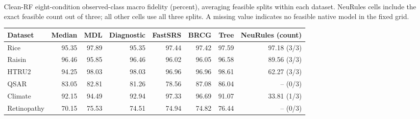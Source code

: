 \begin{kbtable}
\centering
\caption{Clean-RF eight-condition observed-class macro fidelity (percent), averaging feasible splits within each dataset. NeuRules cells include the exact feasible count out of three; all other cells use all three splits. A missing value indicates no feasible native model in the fixed grid.}
\label{tab:independent-per-data}
\small
\begin{adjustbox}{max width=\linewidth}
\begin{tabular}{lrrrrrrr}
\toprule
Dataset & Median & MDL & Diagnostic & FastSRS & BRCG & Tree & NeuRules (count) \\
\midrule
Rice & 95.35 & 97.89 & 95.35 & 97.44 & 97.42 & 97.59 & 97.18 (3/3) \\
Raisin & 96.46 & 95.85 & 96.46 & 96.02 & 96.05 & 96.58 & 89.56 (3/3) \\
HTRU2 & 94.25 & 98.03 & 98.03 & 96.96 & 96.96 & 98.61 & 62.27 (3/3) \\
QSAR & 83.05 & 82.81 & 81.26 & 78.56 & 87.08 & 86.04 & -- (0/3) \\
Climate & 92.15 & 94.49 & 92.94 & 97.33 & 96.69 & 91.07 & 33.81 (1/3) \\
Retinopathy & 70.15 & 75.53 & 74.51 & 74.94 & 74.82 & 76.44 & -- (0/3) \\
\bottomrule
\end{tabular}
\end{adjustbox}
\end{kbtable}
